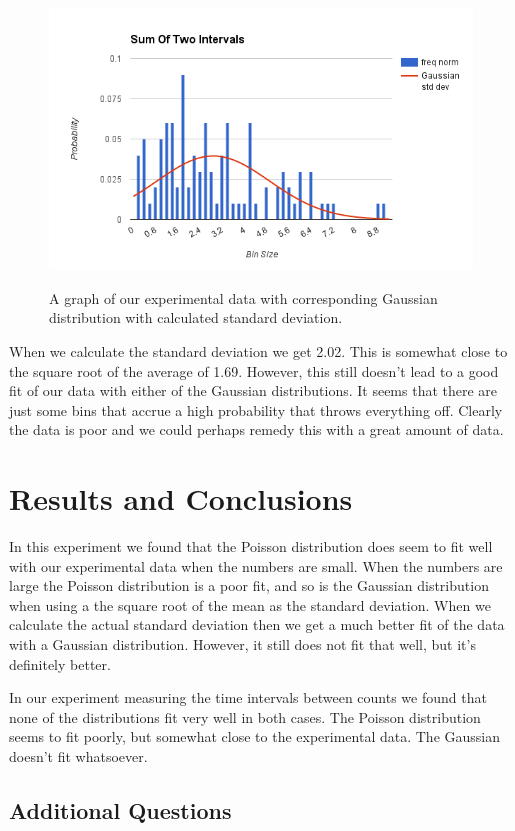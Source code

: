 \documentclass[12pt letterpaper]{article}
\begin{document}
\begin{figure}[H]
  \caption{A graph of our experimental data with corresponding Gaussian distribution with calculated standard deviation.}
  \centering
    \includegraphics[width=.75\textwidth]{section1_2_2_gaussian_std_dev.png}
    \label{fig:section1.2.2gaussianstddev}
\end{figure}

When we calculate the standard deviation we get 2.02. This is somewhat close to the square root of the average of 1.69. However, this still doesn't lead to a good fit of our data with either of the Gaussian distributions. It seems that there are just some bins that accrue a high probability that throws everything off. Clearly the data is poor and we could perhaps remedy this with a great amount of data. 


\section*{Results and Conclusions}

In this experiment we found that the Poisson distribution does seem to fit well with our experimental data when the numbers are small. When the numbers are large the Poisson distribution is a poor fit, and so is the Gaussian distribution when using a the square root of the mean as the standard deviation. When we calculate the actual standard deviation then we get a much better fit of the data with a Gaussian distribution. However, it still does not fit that well, but it's definitely better. 

In our experiment measuring the time intervals between counts we found that none of the distributions fit very well in both cases. The Poisson distribution seems to fit poorly, but somewhat close to the experimental data. The Gaussian doesn't fit whatsoever. 

\subsection*{Additional Questions}
\end{document}
